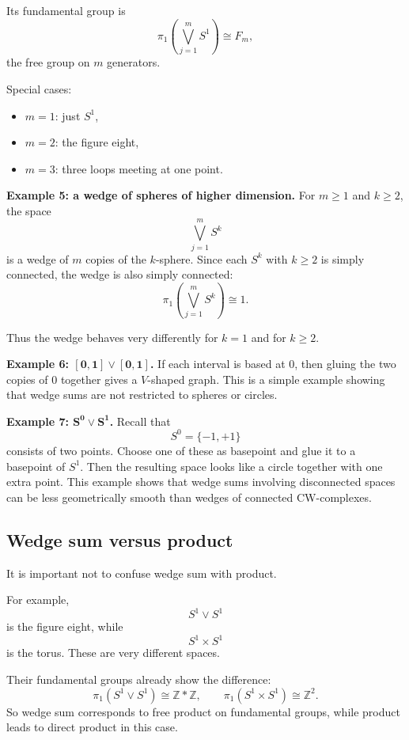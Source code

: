 \documentclass[12pt,a4paper]{article}
\theoremstyle{notespace}
\begin{document}
Its fundamental group is
\[
\pi_1\!\left(\bigvee_{j=1}^m S^1\right)\cong F_m,
\]
the free group on \(m\) generators.

Special cases:
\begin{itemize}
	\item \(m=1\): just \(S^1\),
	\item \(m=2\): the figure eight,
	\item \(m=3\): three loops meeting at one point.
\end{itemize}

\medskip

\textbf{Example 5: a wedge of spheres of higher dimension.}
For \(m\geq 1\) and \(k\geq 2\), the space
\[
\bigvee_{j=1}^m S^k
\]
is a wedge of \(m\) copies of the \(k\)-sphere. Since each \(S^k\) with \(k\geq 2\) is simply connected, the wedge is also simply connected:
\[
\pi_1\!\left(\bigvee_{j=1}^m S^k\right)\cong 1.
\]

Thus the wedge behaves very differently for \(k=1\) and for \(k\geq 2\).

\medskip

\textbf{Example 6: \(\boldsymbol{[0,1]\vee [0,1]}\).}
If each interval is based at \(0\), then gluing the two copies of \(0\) together gives a \(V\)-shaped graph. This is a simple example showing that wedge sums are not restricted to spheres or circles.

\medskip

\textbf{Example 7: \(\boldsymbol{S^0\vee S^1}\).}
Recall that
\[
S^0=\{-1,+1\}
\]
consists of two points. Choose one of these as basepoint and glue it to a basepoint of \(S^1\). Then the resulting space looks like a circle together with one extra point. This example shows that wedge sums involving disconnected spaces can be less geometrically smooth than wedges of connected CW-complexes.

\bigskip

\subsection{Wedge sum versus product}

It is important not to confuse wedge sum with product.

For example,
\[
S^1\vee S^1
\]
is the figure eight, while
\[
S^1\times S^1
\]
is the torus. These are very different spaces.

Their fundamental groups already show the difference:
\[
\pi_1(S^1\vee S^1)\cong \mathbb Z * \mathbb Z,
\qquad
\pi_1(S^1\times S^1)\cong \mathbb Z^2.
\]
So wedge sum corresponds to free product on fundamental groups, while product leads to direct product in this case.
\end{document}
